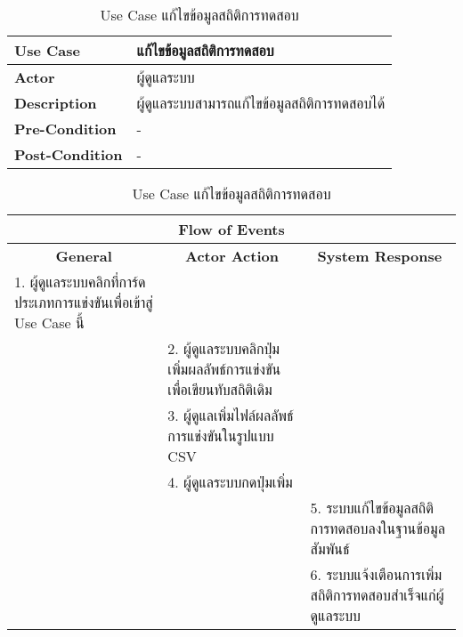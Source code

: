 \begin{table}[H]
    \caption{Use Case แก้ไขข้อมูลสถิติการทดสอบ}
    \label{tab:usecase-edit-stats}
    \begin{tabularx}{\textwidth}{ | p{3cm} | X | }
    \hline
    \textbf{Use Case} & แก้ไขข้อมูลสถิติการทดสอบ \\
    \hline
    \textbf{Actor} & ผู้ดูแลระบบ \\
    \hline
    \textbf{Description} & ผู้ดูแลระบบสามารถแก้ไขข้อมูลสถิติการทดสอบได้ \\
    \hline
    \textbf{Pre-Condition} & - \\
    \hline
    \textbf{Post-Condition} & - \\
    \hline
    \end{tabularx}
    \begin{tabularx}{\textwidth}{ | X | X | X | }
    \multicolumn{3}{|c|}{\textbf{Flow of Events}} \\
    \hline
    \multicolumn{1}{|c|}{\textbf{General}} & \multicolumn{1}{|c|}{\textbf{Actor Action}} & \multicolumn{1}{|c|}{\textbf{System Response}} \\
    \hline
    1. ผู้ดูแลระบบคลิกที่การ์ดประเภทการแข่งขันเพื่อเข้าสู่ Use Case นี้ &  &  \\
    \hline
    & 2. ผู้ดูแลระบบคลิกปุ่มเพิ่มผลลัพธ์การแข่งขันเพื่อเขียนทับสถิติเดิม &  \\
    \hline
    & 3. ผู้ดูแลเพิ่มไฟล์ผลลัพธ์การแข่งขันในรูปแบบ CSV  &  \\
    \hline
    & 4. ผู้ดูแลระบบกดปุ่มเพิ่ม &  \\
    \hline
    & & 5. ระบบแก้ไขข้อมูลสถิติการทดสอบลงในฐานข้อมูลสัมพันธ์ \\
    \hline
    & & 6. ระบบแจ้งเตือนการเพิ่มสถิติการทดสอบสำเร็จแก่ผู้ดูแลระบบ \\
    \hline
    \end{tabularx}
\end{table}

